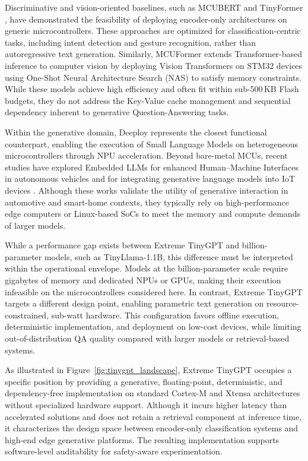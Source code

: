 \documentclass{ieeeaccess}
\begin{document}
Discriminative and vision-oriented baselines, such as MCUBERT \cite{10.1145/3676536.3676747} and TinyFormer \cite{yang2023tinyformer}, have demonstrated the feasibility of deploying encoder-only architectures on generic microcontrollers. These approaches are optimized for classification-centric tasks, including intent detection and gesture recognition, rather than autoregressive text generation. Similarly, MCUFormer \cite{liang2023mcuformer} extends Transformer-based inference to computer vision by deploying Vision Transformers on STM32 devices using One-Shot Neural Architecture Search (NAS) to satisfy memory constraints. While these models achieve high efficiency and often fit within sub-500\,KB Flash budgets, they do not address the Key-Value cache management and sequential dependency inherent to generative Question-Answering tasks.

Within the generative domain, Deeploy \cite{scherer2024deeploy} represents the closest functional counterpart, enabling the execution of Small Language Models on heterogeneous microcontrollers through NPU acceleration. Beyond bare-metal MCUs, recent studies have explored Embedded LLMs for enhanced Human–Machine Interfaces in autonomous vehicles \cite{varshni2025embedded} and for integrating generative language models into IoT devices \cite{yauri2024generative}. Although these works validate the utility of generative interaction in automotive and smart-home contexts, they typically rely on high-performance edge computers or Linux-based SoCs to meet the memory and compute demands of larger models.

While a performance gap exists between Extreme TinyGPT and billion-parameter models, such as TinyLlama-1.1B, this difference must be interpreted within the operational envelope. Models at the billion-parameter scale require gigabytes of memory and dedicated NPUs or GPUs, making their execution infeasible on the microcontrollers considered here. In contrast, Extreme TinyGPT targets a different design point, enabling parametric text generation on resource-constrained, sub-watt hardware. This configuration favors offline execution, deterministic implementation, and deployment on low-cost devices, while limiting out-of-distribution QA quality compared with larger models or retrieval-based systems.



As illustrated in Figure~\ref{fig:tinygpt_landscape}, Extreme TinyGPT occupies a specific position by providing a generative, floating-point, deterministic, and dependency-free implementation on standard Cortex-M and Xtensa architectures without specialized hardware support. Although it incurs higher latency than accelerated solutions and does not retain a retrieval component at inference time, it characterizes the design space between encoder-only classification systems and high-end edge generative platforms. The resulting implementation supports software-level auditability for safety-aware experimentation.
\end{document}
